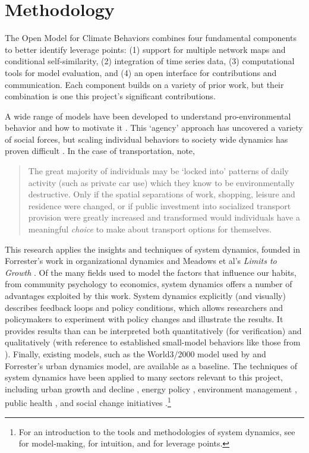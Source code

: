 \documentclass[12pt, oneside]{amsart}
\begin{document}
\section*{Methodology}

The Open Model for Climate Behaviors combines four fundamental components to better identify leverage points: (1) support for multiple network maps and conditional self-similarity, (2) integration of time series data, (3) computational tools for model evaluation, and (4) an open interface for contributions and communication.  Each component builds on a variety of prior work, but their combination is one this project's significant contributions.

A wide range of models have been developed to understand pro-environmental behavior and how to motivate it \citep{kollmuss2002mind, Hines1986}.  This `agency' approach has uncovered a variety of social forces, but scaling individual behaviors to society wide dynamics has proven difficult \citep{may1954intransitivity}.  In the case of transportation, \citet{redclift1994social} note,
\begin{quotation}
\begin{small}
The great majority of individuals may be `locked into' patterns of daily activity (such as private car use) which they know to be environmentally destructive.  Only if the spatial separations of work, shopping, leisure and residence were changed, or if public investment into socialized transport provision were greatly increased and transformed would individuals have a meaningful \emph{choice} to make about transport options for themselves.
\end{small}
\end{quotation}

This research applies the insights and techniques of system dynamics, founded in Forrester's work in organizational dynamics \citeyearpar{forrester1961industrial} and Meadows et al's \emph{Limits to Growth} \citeyearpar{meadows2004limits}.  Of the many fields used to model the factors that influence our habits, from community psychology to economics, system dynamics offers a number of advantages exploited by this work.  System dynamics explicitly (and visually) describes feedback loops and policy conditions, which allows researchers and policymakers to experiment with policy changes and illustrate the results.  It provides results than can be interpreted both quantitatively (for verification) and qualitatively (with reference to established small-model behaviors like those from \citet{senge2006fifth}).  Finally, existing models, such as the World3/2000 model used by \citeauthor{meadows2004limits} and Forrester's urban dynamics model, are available as a baseline.  The techniques of system dynamics have been applied to many sectors relevant to this project, including urban growth and decline \citep{forrester1971urban}, energy policy \citep{Naill1992}, environment management \citep{fletcher1998use, Guo2001}, public health \citep{Homer2001}, and social change initiatives \citep{repenning2002simulation}.\footnote{For an introduction to the tools and methodologies of system dynamics, see \cite{sterman2000business} for model-making, \cite{senge2006fifth} for intuition, and \cite{meadows1997places} for leverage points.}
\end{document}
